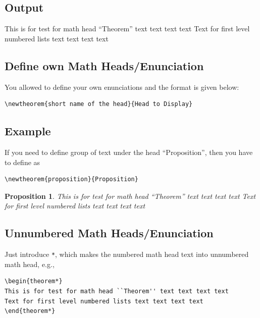 \documentclass[]{Liebert_Author}
\begin{document}
\subsection{Output}

\begin{theorem}
This is for test for math head ``Theorem'' text text text text
Text for first level numbered lists text text text text 
\end{theorem}

\subsection{Define own Math Heads/Enunciation}

You allowed to define your own enunciations and the format is given
below:

\begin{verbatim}
\newtheorem{short name of the head}{Head to Display}
\end{verbatim}

\subsection*{Example}

If you need to define group of text under the head ``Proposition'',
then you have to define as 

\begin{verbatim}
\newtheorem{proposition}{Proposition}
\end{verbatim}

\newtheorem{proposition}{Proposition}
\begin{proposition}
This is for test for math head ``Theorem'' text text text text
Text for first level numbered lists text text text text 
\end{proposition}

\subsection{Unnumbered Math Heads/Enunciation}

Just introduce \verb!*!, which makes the numbered math head text
into unnumbered math head, e.g.,

\begin{verbatim}
\begin{theorem*}
This is for test for math head ``Theorem'' text text text text
Text for first level numbered lists text text text text 
\end{theorem*}
\end{verbatim}
\end{document}
